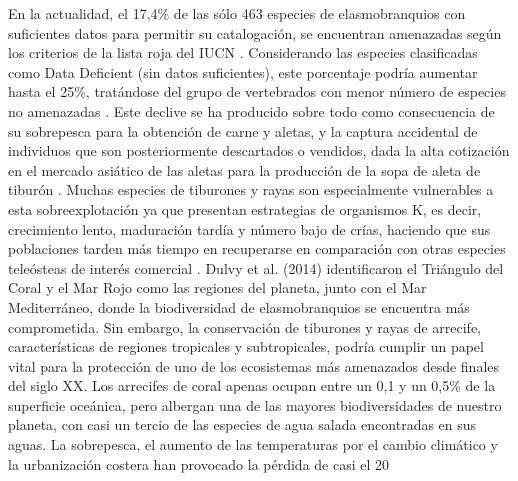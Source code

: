 \documentclass[a4paper, 11pt]{article}
\begin{document}
En la actualidad, el 17,4\% de las sólo 463 especies de elasmobranquios con suficientes datos para permitir su catalogación, se encuentran amenazadas según los criterios de la lista roja del IUCN \cite{Dulvy2014}. Considerando las especies clasificadas como Data Deficient (sin datos suficientes), este porcentaje podría aumentar hasta el 25\%, tratándose del grupo de vertebrados con menor número de especies no amenazadas \cite{Hoffmann2010}. Este declive se ha producido sobre todo como consecuencia de su sobrepesca para la obtención de carne y aletas, y la captura accidental de individuos que son posteriormente descartados o vendidos, dada la alta cotización en el mercado asiático de las aletas para la producción de la sopa de aleta de tiburón \cite{Dent2015, Dulvy2017}. Muchas especies de tiburones y rayas son especialmente vulnerables a esta sobreexplotación ya que presentan estrategias de organismos K, es decir, crecimiento lento, maduración tardía y número bajo de crías, haciendo que sus poblaciones tarden más tiempo en recuperarse en comparación con otras especies teleósteas de interés comercial \cite{Stevens2000}.
Dulvy et al. (2014) identificaron el Triángulo del Coral y el Mar Rojo como las regiones del planeta, junto con el Mar Mediterráneo, donde la biodiversidad de elasmobranquios se encuentra más comprometida. Sin embargo, la conservación de tiburones y rayas de arrecife, características de regiones tropicales y subtropicales, podría cumplir un papel vital para la protección de uno de los ecosistemas más amenazados desde finales del siglo XX. Los arrecifes de coral apenas ocupan entre un 0,1 y un 0,5\% de la superficie oceánica, pero albergan una de las mayores biodiversidades de nuestro planeta, con casi un tercio de las especies de agua salada encontradas en sus aguas. La sobrepesca, el aumento de las temperaturas por el cambio climático y la urbanización costera han provocado la pérdida de casi el 20%
\end{document}
